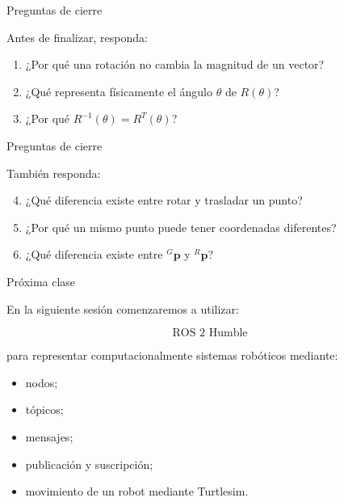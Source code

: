 \documentclass[aspectratio=169]{beamer}
\begin{document}
\begin{frame}{Preguntas de cierre}

    Antes de finalizar, responda:

    \begin{enumerate}
        \item ¿Por qué una rotación no cambia la magnitud de un vector?
        \item ¿Qué representa físicamente el ángulo $\theta$ de $R(\theta)$?
        \item ¿Por qué $R^{-1}(\theta)=R^T(\theta)$?
    \end{enumerate}

\end{frame}

\begin{frame}{Preguntas de cierre}

    También responda:

    \begin{enumerate}
        \setcounter{enumi}{3}
        \item ¿Qué diferencia existe entre rotar y trasladar un punto?
        \item ¿Por qué un mismo punto puede tener coordenadas diferentes?
        \item ¿Qué diferencia existe entre ${}^{G}\mathbf{p}$ y
        ${}^{R}\mathbf{p}$?
    \end{enumerate}

    \vspace{0.3cm}


\end{frame}

\begin{frame}{Próxima clase}

    En la siguiente sesión comenzaremos a utilizar:

    \[
    \boxed{\text{ROS 2 Humble}}
    \]

    para representar computacionalmente sistemas robóticos mediante:

    \begin{itemize}
        \item nodos;
        \item tópicos;
        \item mensajes;
        \item publicación y suscripción;
        \item movimiento de un robot mediante Turtlesim.
    \end{itemize}

\end{frame}
\end{document}
